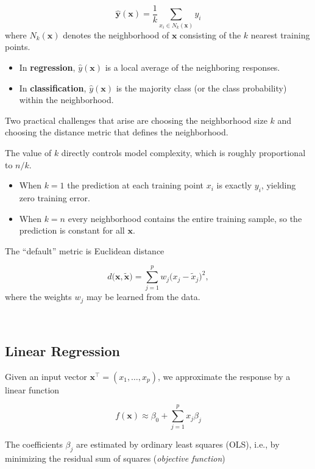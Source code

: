 \documentclass[
]{book}
\providecommand{\tightlist}{%
  \setlength{\itemsep}{0pt}\setlength{\parskip}{0pt}}
\begin{document}
\[\hat{\mathbf{y}}(\mathbf{x}) = \frac{1}{k} \sum_{x_i \in N_k(\mathbf{x})} y_i\]
where \(N_k(\mathbf{x})\) denotes the neighborhood of \(\mathbf{x}\) consisting of the \(k\) nearest training points.

\begin{itemize}
\tightlist
\item
  In \textbf{regression}, \(\hat{y}(\mathbf{x})\) is a local average of the neighboring responses.\\
\item
  In \textbf{classification}, \(\hat{y}(\mathbf{x})\) is the majority class (or the class probability) within the neighborhood.
\end{itemize}

Two practical challenges that arise are choosing the neighborhood size \(k\) and choosing the distance metric that defines the neighborhood.

The value of \(k\) directly controls model complexity, which is roughly proportional to \(n/k\).

\begin{itemize}
\tightlist
\item
  When \(k=1\) the prediction at each training point \(x_i\) is exactly \(y_i\), yielding zero training error.\\
\item
  When \(k=n\) every neighborhood contains the entire training sample, so the prediction is constant for all \(\mathbf{x}\).
\end{itemize}

The ``default'' metric is Euclidean distance

\[d\bigl( \mathbf{x}, \tilde{\mathbf{x}} \bigr) = \sum_{j=1}^{p} w_j \bigl( x_j - \tilde{x}_j \bigr)^2,\]
where the weights \(w_j\) may be learned from the data.

~

\subsection{Linear Regression}\label{linear-regression}

Given an input vector \(\mathbf{x}^\top = (x_1,\dots,x_p)\), we approximate the response by a linear function

\[f(\mathbf{x}) \approx \beta_0 + \sum_{j=1}^{p} x_j \beta_j\]

The coefficients \(\beta_j\) are estimated by ordinary least squares (OLS), i.e., by minimizing the residual sum of squares (\emph{objective function})
\end{document}
